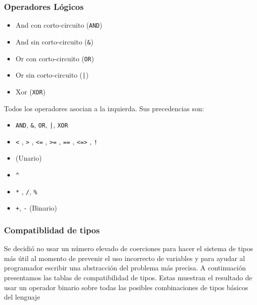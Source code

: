 \documentclass[12pt, spanish]{report}
\begin{document}
\subsubsection{Operadores L\'ogicos}
\begin{itemize}
\item And con corto-circuito (\texttt{AND})
\item And sin corto-circuito (\texttt{\&})
\item Or con corto-circuito  (\texttt{OR})
\item Or sin corto-circuito  (\texttt{|})
\item Xor (\texttt{XOR})
\end{itemize}

Todos los operadores asocian a la izquierda. Sus precedencias son:
\begin{itemize}
\item \texttt{AND}, \texttt{\&}, \texttt{OR}, \texttt{|}, \texttt{XOR}
\item \texttt{<} , \texttt{>} , \texttt{<=} , \texttt{>=} , \texttt{==} , \texttt{<=>} , \texttt{!}
\item \texttt{\-} (Unario)
\item \texttt{\^}
\item \texttt{*} ,  \texttt{/}, \texttt{\%}
\item \texttt{+}, \texttt{-} (Binario)
\end{itemize}

\subsubsection{Compatiblidad de tipos}
Se decidi\'o no usar un n\'umero elevado de coerciones para hacer el
sistema de tipos m\'as \'util al momento de prevenir el uso incorrecto
de variables y para ayudar al programador escribir una abstracci\'on del
problema m\'as precisa.
A continuaci\'on presentamos las tablas de compatibilidad de
tipos. Estas muestran el resultado de usar un operador binario sobre
todas las posibles combinaciones de tipos b\'asicos del lenguaje 
\end{document}
